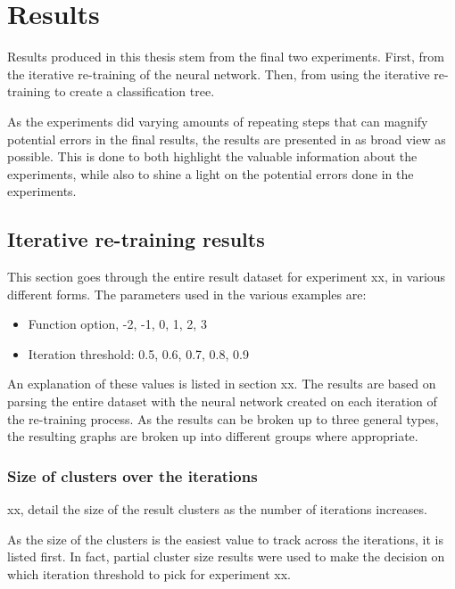 \chapter{Results}


Results produced in this thesis stem from the final two experiments.
First, from the iterative re-training of the neural network.
Then, from using the iterative re-training to create a classification tree.

As the experiments did varying amounts of repeating steps that can magnify potential errors in the final results, the results are presented in as broad view as possible.
This is done to both highlight the valuable information about the experiments, while also to shine a light on the potential errors done in the experiments.

\section{Iterative re-training results}
This section goes through the entire result dataset for experiment xx, in various different forms.
The parameters used in the various examples are:

\begin{itemize}
    \item Function option, -2, -1, 0, 1, 2, 3
    \item Iteration threshold: 0.5, 0.6, 0.7, 0.8, 0.9
\end{itemize}{}
An explanation of these values is listed in section xx.
The results are based on parsing the entire dataset with the neural network created on each iteration of the re-training process.
As the results can be broken up to three general types, the resulting graphs are broken up into different groups where appropriate.

\subsection{Size of clusters over the iterations}
xx, detail the size of the result clusters as the number of iterations increases.

As the size of the clusters is the easiest value to track across the iterations, it is listed first.
In fact, partial cluster size results were used to make the decision on which iteration threshold to pick for experiment xx.

